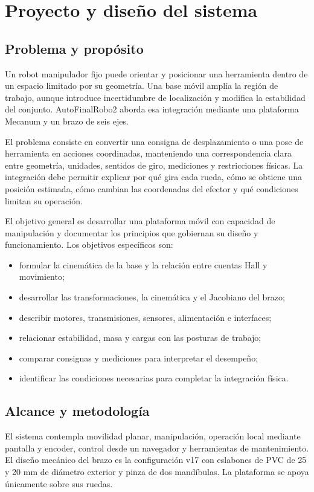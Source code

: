 \chapter{Proyecto y diseño del sistema}
\label{cap:proyecto}

\section{Problema y propósito}
Un robot manipulador fijo puede orientar y posicionar una herramienta dentro de un espacio limitado por su geometría. Una base móvil amplía la región de trabajo, aunque introduce incertidumbre de localización y modifica la estabilidad del conjunto. AutoFinalRobo2 aborda esa integración mediante una plataforma Mecanum y un brazo de seis ejes.

El problema consiste en convertir una consigna de desplazamiento o una pose de herramienta en acciones coordinadas, manteniendo una correspondencia clara entre geometría, unidades, sentidos de giro, mediciones y restricciones físicas. La integración debe permitir explicar por qué gira cada rueda, cómo se obtiene una posición estimada, cómo cambian las coordenadas del efector y qué condiciones limitan su operación.

El objetivo general es desarrollar una plataforma móvil con capacidad de manipulación y documentar los principios que gobiernan su diseño y funcionamiento. Los objetivos específicos son:
\begin{itemize}
\item formular la cinemática de la base y la relación entre cuentas Hall y movimiento;
\item desarrollar las transformaciones, la cinemática y el Jacobiano del brazo;
\item describir motores, transmisiones, sensores, alimentación e interfaces;
\item relacionar estabilidad, masa y cargas con las posturas de trabajo;
\item comparar consignas y mediciones para interpretar el desempeño;
\item identificar las condiciones necesarias para completar la integración física.
\end{itemize}

\section{Alcance y metodología}
El sistema contempla movilidad planar, manipulación, operación local mediante pantalla y encoder, control desde un navegador y herramientas de mantenimiento. El diseño mecánico del brazo es la configuración v17 con eslabones de PVC de 25 y 20 mm de diámetro exterior y pinza de dos mandíbulas. La plataforma se apoya únicamente sobre sus ruedas.

